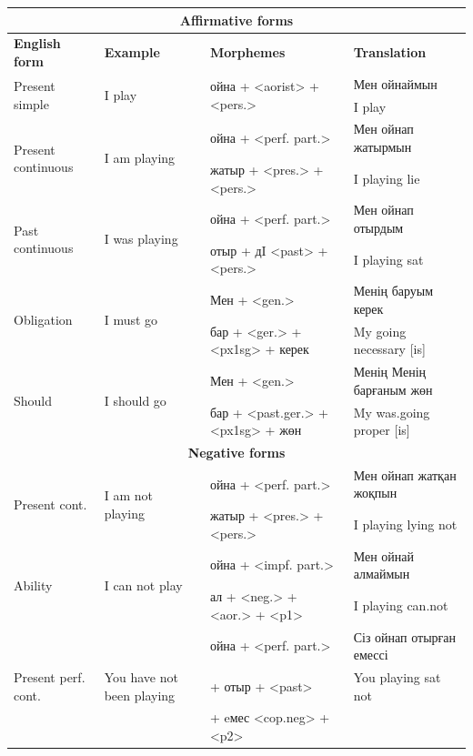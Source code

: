 \documentclass[11pt]{article}
\begin{document}
\begin{table}
  \centering
  \begin{tabular}{|l|l|l|l|}
    \hline
    \multicolumn{4}{|c|}{\textbf{Affirmative forms}} \\
    \hline
    \textbf{English form} & \textbf{Example} & \textbf{Morphemes} & \textbf{Translation} \\
    \hline
    \multirow{2}{*}{Present simple} & \multirow{2}{*}{I play} & \multirow{2}{*}{ойна + <aorist> + <pers.>} & Мен ойнаймын \\
                                    &                         &                                            & I play \\
    \hline
    \multirow{2}{*}{Present continuous} & \multirow{2}{*}{I am playing} & ойна + <perf. part.>  & Мен ойнап жатырмын \\
                                    &                         &   жатыр + <pres.> + <pers.>     & I playing lie \\
    \hline
    \multirow{2}{*}{Past continuous} & \multirow{2}{*}{I was playing} & ойна + <perf. part.>  & Мен ойнап отырдым \\
                                    &                         & отыр + д{I} <past>  + <pers.>     & I playing sat \\
    \hline
    \multirow{2}{*}{Obligation} & \multirow{2}{*}{I must go} & Мен  + <gen.>  & Менің баруым керек \\
                                    &                         & бар + <ger.> +  <px1sg> + керек    & My going necessary [is] \\
    \hline
    \multirow{2}{*}{Should} & \multirow{2}{*}{I should go} & Мен  + <gen.>  & Менің Менің барғаным жөн \\
                                    &                         & бар + <past.ger.> +  <px1sg> + жөн & My was.going proper [is] \\
    \hline
    \multicolumn{4}{|c|}{\textbf{Negative forms}} \\
    \hline
    \multirow{2}{*}{Present cont.} & \multirow{2}{*}{I am not playing} & ойна + <perf. part.>  & Мен ойнап жатқан жоқпын \\
                                    &                         &   жатыр + <pres.> + <pers.>     & I playing lying not \\
    \hline
    \multirow{2}{*}{Ability} & \multirow{2}{*}{I can not play} & ойна + <impf. part.>  & Мен ойнай алмаймын \\
                                    &                         &   ал + <neg.> + <aor.> + <p1>     & I playing can.not \\
    \hline
    \multirow{3}{*}{Present perf. cont. } & \multirow{3}{*}{You have not been playing} & ойна + <perf. part.>  & Сіз ойнап отырған емессі \\
                                    &                         & +  отыр + <past>  & You playing sat not  \\
                                    &                         & + eмес <cop.neg> + <p2> & \\
    \hline
    

\end{tabular}
\end{table}
\end{document}
